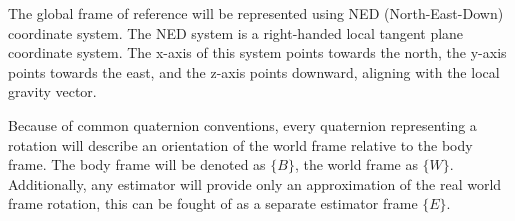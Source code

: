 The global frame of reference will be represented using NED (North-East-Down) coordinate system. The NED system is a right-handed local tangent plane coordinate system. The x-axis of this system points towards the north, the y-axis points towards the east, and the z-axis points downward, aligning with the local gravity vector.

Because of common quaternion conventions, every quaternion representing a rotation will describe an orientation of the world frame relative to the body frame. The body frame will be denoted as $\{B\}$, the world frame as $\{W\}$. Additionally, any estimator will provide only an approximation of the real world frame rotation, this can be fought of as a separate estimator frame $\{E\}$.

